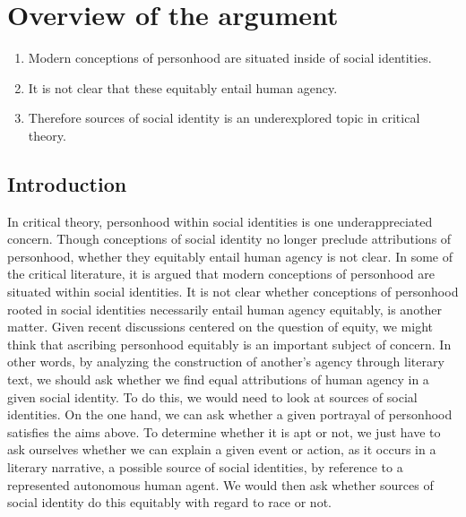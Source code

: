 \documentclass[phdthesis,12pt,final,a4paper]{wuthesis}
\theoremstyle{definition}
\theoremstyle{definition}
\theoremstyle{definition}
\theoremstyle{definition}
\theoremstyle{remark}
\begin{document}
\section{Overview of the argument}\label{overview-of-the-argument}

\begin{enumerate}
\def\labelenumi{\arabic{enumi}.}
\tightlist
\item
  Modern conceptions of personhood are situated inside of social identities.
\item
  It is not clear that these equitably entail human agency.
\item
  Therefore sources of social identity is an underexplored topic in critical theory.
\end{enumerate}

\subsection*{Introduction}\label{introduction-2}

In critical theory, personhood within social identities is one underappreciated concern. Though conceptions of social identity no longer preclude attributions of personhood, whether they equitably entail human agency is not clear. In some of the critical literature, it is argued that modern conceptions of personhood are situated within social identities. It is not clear whether conceptions of personhood rooted in social identities necessarily entail human agency equitably, is another matter. Given recent discussions centered on the question of equity, we might think that ascribing personhood equitably is an important subject of concern. In other words, by analyzing the construction of another's agency through literary text, we should ask whether we find equal attributions of human agency in a given social identity. To do this, we would need to look at sources of social identities. On the one hand, we can ask whether a given portrayal of personhood satisfies the aims above. To determine whether it is apt or not, we just have to ask ourselves whether we can explain a given event or action, as it occurs in a literary narrative, a possible source of social identities, by reference to a represented autonomous human agent. We would then ask whether sources of social identity do this equitably with regard to race or not.
\end{document}
